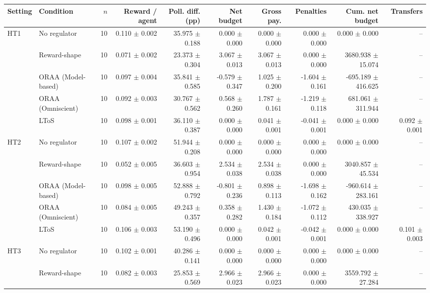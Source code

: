 \begin{tabular}{llrrrrrrrr}
\toprule
Setting & Condition & $n$ & Reward / agent & Poll. diff. (pp) & Net budget & Gross pay. & Penalties & Cum. net budget & Transfers \\
\midrule
HT1 & No regulator & 10 & 0.110 $\pm$ 0.002 & 35.975 $\pm$ 0.188 & 0.000 $\pm$ 0.000 & 0.000 $\pm$ 0.000 & 0.000 $\pm$ 0.000 & 0.000 $\pm$ 0.000 & -- \\
 & Reward-shape & 10 & 0.071 $\pm$ 0.002 & 23.373 $\pm$ 0.304 & 3.067 $\pm$ 0.013 & 3.067 $\pm$ 0.013 & 0.000 $\pm$ 0.000 & 3680.938 $\pm$ 15.074 & -- \\
 & ORAA (Model-based) & 10 & 0.097 $\pm$ 0.004 & 35.841 $\pm$ 0.585 & -0.579 $\pm$ 0.347 & 1.025 $\pm$ 0.200 & -1.604 $\pm$ 0.161 & -695.189 $\pm$ 416.625 & -- \\
 & ORAA (Omniscient) & 10 & 0.092 $\pm$ 0.003 & 30.767 $\pm$ 0.562 & 0.568 $\pm$ 0.260 & 1.787 $\pm$ 0.161 & -1.219 $\pm$ 0.118 & 681.061 $\pm$ 311.944 & -- \\
 & LToS & 10 & 0.098 $\pm$ 0.001 & 36.110 $\pm$ 0.387 & 0.000 $\pm$ 0.000 & 0.041 $\pm$ 0.001 & -0.041 $\pm$ 0.001 & 0.000 $\pm$ 0.000 & 0.092 $\pm$ 0.001 \\
\addlinespace
HT2 & No regulator & 10 & 0.107 $\pm$ 0.002 & 51.944 $\pm$ 0.208 & 0.000 $\pm$ 0.000 & 0.000 $\pm$ 0.000 & 0.000 $\pm$ 0.000 & 0.000 $\pm$ 0.000 & -- \\
 & Reward-shape & 10 & 0.052 $\pm$ 0.005 & 36.603 $\pm$ 0.954 & 2.534 $\pm$ 0.038 & 2.534 $\pm$ 0.038 & 0.000 $\pm$ 0.000 & 3040.857 $\pm$ 45.534 & -- \\
 & ORAA (Model-based) & 10 & 0.098 $\pm$ 0.005 & 52.888 $\pm$ 0.792 & -0.801 $\pm$ 0.236 & 0.898 $\pm$ 0.113 & -1.698 $\pm$ 0.162 & -960.614 $\pm$ 283.161 & -- \\
 & ORAA (Omniscient) & 10 & 0.084 $\pm$ 0.005 & 49.243 $\pm$ 0.357 & 0.358 $\pm$ 0.282 & 1.430 $\pm$ 0.184 & -1.072 $\pm$ 0.112 & 430.035 $\pm$ 338.927 & -- \\
 & LToS & 10 & 0.106 $\pm$ 0.003 & 53.190 $\pm$ 0.496 & 0.000 $\pm$ 0.000 & 0.042 $\pm$ 0.001 & -0.042 $\pm$ 0.001 & 0.000 $\pm$ 0.000 & 0.101 $\pm$ 0.003 \\
\addlinespace
HT3 & No regulator & 10 & 0.102 $\pm$ 0.001 & 40.286 $\pm$ 0.141 & 0.000 $\pm$ 0.000 & 0.000 $\pm$ 0.000 & 0.000 $\pm$ 0.000 & 0.000 $\pm$ 0.000 & -- \\
 & Reward-shape & 10 & 0.082 $\pm$ 0.003 & 25.853 $\pm$ 0.569 & 2.966 $\pm$ 0.023 & 2.966 $\pm$ 0.023 & 0.000 $\pm$ 0.000 & 3559.792 $\pm$ 27.284 & -- \\

\end{tabular}
